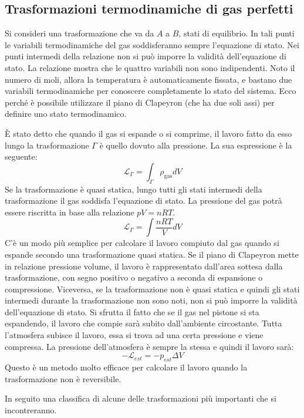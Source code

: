 \documentclass[10pt,a4paper]{book}
\begin{document}
\subsection{Trasformazioni termodinamiche di gas perfetti}

Si consideri una trasformazione che va da $A$ a $B$, stati di equilibrio. In tali punti le variabili termodinamiche del gas soddisferanno sempre l'equazione di stato. Nei punti intermedi della relazione non si può imporre la validità dell'equazione di stato.
La relazione mostra che le quattro variabili non sono indipendenti. Noto il numero di moli, allora la temperatura è automaticamente fissata, e bastano due variabili termodinamiche per conoscere completamente lo stato del sistema. Ecco perché è possibile utilizzare il piano di Clapeyron (che ha due soli assi) per definire uno stato termodinamico.

È stato detto che quando il gas si espande o si comprime, il lavoro fatto da esso lungo la trasformazione $\Gamma$ è quello dovuto alla pressione. La sua espressione è la seguente:
\[
	\mathcal{L}_{\Gamma} = \int_{\Gamma }\rho_{\text{gas} }dV
\]
Se la trasformazione è quasi statica, lungo tutti gli stati intermedi della trasformazione il gas soddisfa l'equazione di stato. La pressione del gas potrà essere riscritta in base alla relazione $pV=nRT$.
\[
	\mathcal{L}_{\Gamma }= \int \frac{nRT}{V}dV
\]
C'è un modo più semplice per calcolare il lavoro compiuto dal gas quando si espande secondo una trasformazione quasi statica. Se il piano di Clapeyron mette in relazione pressione volume, il lavoro è rappresentato dall'area sottesa dalla trasformazione, con segno positivo o negativo a seconda di espansione o compressione.
Viceversa, se la trasformazione non è quasi statica e quindi gli stati intermedi durante la trasformazione non sono noti, non si può imporre la validità dell'equazione di stato. Si sfrutta il fatto che se il gas nel pistone si sta espandendo, il lavoro che compie sarà subito dall'ambiente circostante. Tutta l'atmosfera subisce il lavoro, essa si trova ad una certa pressione e viene compressa. La pressione dell'atmosfera è sempre la stessa e quindi il lavoro sarà:
\[
	-\mathcal{L}_{est} = - p_{est}\Delta V
\]
Questo è un metodo molto efficace per calcolare il lavoro quando la trasformazione non è reversibile.

In seguito una classifica di alcune delle trasformazioni più importanti che si incontreranno.
\end{document}
